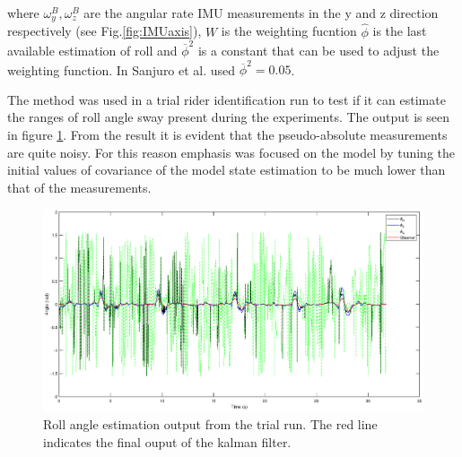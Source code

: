 where \ensuremath{\omega_{y}^{B},\omega_{z}^{B}} are the angular rate IMU measurements in the y and z direction respectively (see Fig.\ref{fig:IMUaxis}), \ensuremath{W } is the weighting fucntion  \ensuremath{\hat{\phi}} is the last available estimation of roll and \ensuremath{\overline{\phi}^2} is a constant that can be used to adjust the weighting function. In \cite{sanjurjo2018roll} Sanjuro et al. used  \ensuremath{\overline{\phi}^2=0.05}.

 The method was used in a trial rider identification run to test if it can estimate the ranges of roll angle sway present during the experiments. The output is seen in figure \ref{fig:rollangleobserverplot}. From the result it is evident that the pseudo-absolute measurements are  quite noisy. For this reason emphasis was focused on the model by tuning the initial values of covariance of the model state estimation to be much lower than that of the measurements.

 \begin{figure}[h]
    \centering
    \captionsetup{justification=centering,margin=2cm}
    \includegraphics[scale=0.4]{images/rollangle_plot.eps}
        \caption[Short title]{Roll angle estimation output from the trial run. The red line indicates the final ouput of the kalman filter.}
    \label{fig:rollangleobserverplot}
\end{figure}
